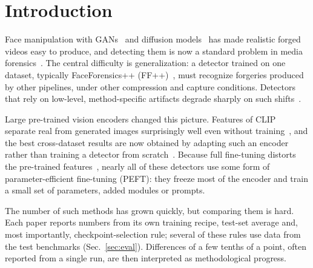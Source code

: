 \documentclass[fonts]{icst}
\begin{document}


\maketitle

\section{Introduction}

Face manipulation with GANs~\cite{goodfellow2020gan} and diffusion models~\cite{yang2022diffusion} has made realistic forged videos easy to produce, and detecting them is now a standard problem in media forensics~\cite{pei2024survey,liu2024evolving}. The central difficulty is generalization: a detector trained on one dataset, typically FaceForensics++ (FF++)~\cite{rossler2019ff}, must recognize forgeries produced by other pipelines, under other compression and capture conditions. Detectors that rely on low-level, method-specific artifacts degrade sharply on such shifts~\cite{qian2020frequency,luo2021srm,yan2023deepfakebench}.

Large pre-trained vision encoders changed this picture. Features of CLIP~\cite{radford2021clip_vitl} separate real from generated images surprisingly well even without training~\cite{ojha2023universal,tsai2024trainingfree}, and the best cross-dataset results are now obtained by adapting such an encoder rather than training a detector from scratch~\cite{yan2025effort,yermakov2025gend,cui2025forada}. Because full fine-tuning distorts the pre-trained features~\cite{kumar2022finetuning}, nearly all of these detectors use some form of parameter-efficient fine-tuning (PEFT): they freeze most of the encoder and train a small set of parameters, added modules or prompts.

The number of such methods has grown quickly, but comparing them is hard. Each paper reports numbers from its own training recipe, test-set average and, most importantly, checkpoint-selection rule; several of these rules use data from the test benchmarks (Sec.~\ref{sec:eval}). Differences of a few tenths of a point, often reported from a single run, are then interpreted as methodological progress.
\end{document}
